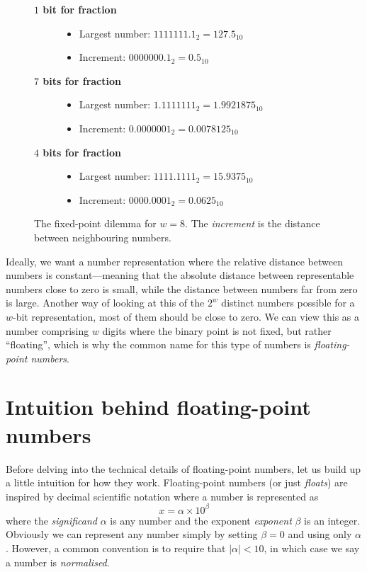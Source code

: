 \begin{figure}
  \begin{framed}
  \centering
    \begin{description}
  \item[\textbf{$1$ bit for fraction}]\hfill
    \begin{itemize}
    \item Largest number: $1111111.1_{2} = 127.5_{10}$
    \item Increment: $0000000.1_{2}=0.5_{10}$
    \end{itemize}
  \item[\textbf{$7$ bits for fraction}]\hfill
    \begin{itemize}
    \item Largest number: $1.1111111_{2} = 1.9921875_{10}$
    \item Increment: $0.0000001_{2}=0.0078125_{10}$
    \end{itemize}
  \item[\textbf{$4$ bits for fraction}]\hfill
    \begin{itemize}
    \item Largest number: $1111.1111_{2} = 15.9375_{10}$
    \item Increment: $0000.0001_{2}=0.0625_{10}$
    \end{itemize}
  \end{description}
  \end{framed}
  \caption{The fixed-point dilemma for $w=8$.  The \emph{increment} is the
    distance between neighbouring numbers.}
  \label{fig:fixedpoint}
\end{figure}

Ideally, we want a number representation where the relative distance
between numbers is constant---meaning that the absolute distance
between representable numbers close to zero is small, while the
distance between numbers far from zero is large.  Another way of
looking at this of the $2^{w}$ distinct numbers possible for a $w$-bit
representation, most of them should be close to zero.  We can view
this as a number comprising $w$ digits where the binary point is not
fixed, but rather ``floating'', which is why the common name for this
type of numbers is \emph{floating-point numbers}.

\section{Intuition behind floating-point numbers}

Before delving into the technical details of floating-point numbers,
let us build up a little intuition for how they work.  Floating-point
numbers (or just \emph{floats}) are inspired by decimal scientific
notation where a number is represented as
\begin{equation}
  x = \alpha \times 10^{\beta}
\end{equation}
where the \emph{significand} $\alpha$ is any number and the exponent
\emph{exponent} $\beta$ is an integer.  Obviously we can represent any
number simply by setting $\beta=0$ and using only $\alpha$.  However,
a common convention is to require that $|\alpha|<10$, in which case we
say a number is \emph{normalised}.

